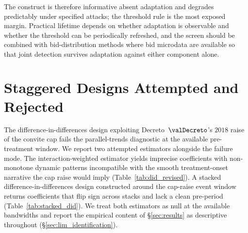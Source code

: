 The construct is therefore informative absent adaptation and
degrades predictably under specified attacks; the threshold rule
is the most exposed margin. Practical lifetime depends on
whether adaptation is observable and whether the threshold can
be periodically refreshed, and the screen should be combined
with bid-distribution methods where bid microdata are available
so that joint detection survives adaptation against either
component alone.

\section{Staggered Designs Attempted and Rejected}
\label{app:staggered}

The difference-in-differences design exploiting Decreto~$\valDecreto$'s
$2018$ raise of the convite cap fails the parallel-trends
diagnostic at the available pre-treatment window. We report two
attempted estimators alongside the failure mode. The
\citet{sun2021estimating} interaction-weighted estimator yields
imprecise coefficients with non-monotone dynamic patterns
incompatible with the smooth treatment-onset narrative the cap
raise would imply (Table~\ref{tab:did_revised}). A stacked
difference-in-differences design constructed around the cap-raise
event window returns coefficients that flip sign across stacks
and lack a clean pre-period (Table~\ref{tab:stacked_did}). We
treat both estimators as null at the available bandwidths and
report the empirical content of §\ref{sec:results} as
descriptive throughout (§\ref{sec:lim_identification}).




